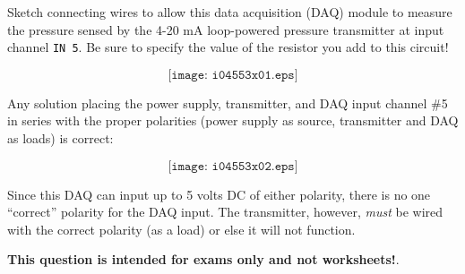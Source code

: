 

Sketch connecting wires to allow this data acquisition (DAQ) module to measure the pressure sensed by the 4-20 mA loop-powered pressure transmitter at input channel {\tt IN 5}.  Be sure to specify the value of the resistor you add to this circuit!

\vskip 50pt

$$\texttt{[image: i04553x01.eps]}$$







Any solution placing the power supply, transmitter, and DAQ input channel \#5 in series with the proper polarities (power supply as source, transmitter and DAQ as loads) is correct:

$$\texttt{[image: i04553x02.eps]}$$

Since this DAQ can input up to 5 volts DC of either polarity, there is no one ``correct'' polarity for the DAQ input.  The transmitter, however, {\it must} be wired with the correct polarity (as a load) or else it will not function.







{\bf This question is intended for exams only and not worksheets!}.


